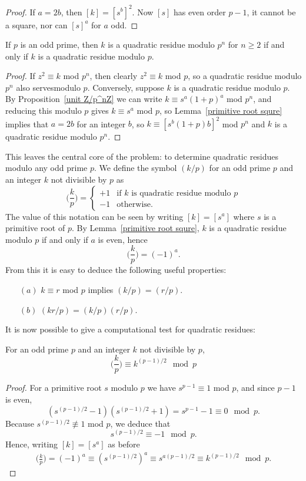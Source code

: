 \begin{proof}
If $a=2b$, then $[k]=[s^b]^2$. Now $[s]$ has even order $p-1$, it cannot be a square, nor can $[s]^a$ for $a$ odd.
\end{proof}
\begin{proposition}
If $p$ is an odd prime, then $k$ is a quadratic residue modulo $p^n$ for $n\geq 2$ if and only if $k$ is a quadratic residue modulo $p$.
\end{proposition}
\begin{proof}
If $z^2\equiv k$ mod $p^n$, then clearly $z^2\equiv k$ mod $p$, so a quadratic residue modulo $p^n$ also servesmodulo $p$. Conversely, suppose $k$ is a quadratic residue modulo $p$. By Proposition~\ref{unit Z/p^nZ} we can write $k\equiv s^a(1+p)^a$ mod $p^n$, and reducing this modulo $p$ gives $k\equiv s^a$ mod $p$, so Lemma~\ref{primitive root squre} implies that $a=2b$ for an integer $b$, so $k\equiv[s^b(1+p)b]^2$ mod $p^n$ and $k$ is a quadratic residue modulo $p^n$.
\end{proof}
This leaves the central core of the problem: to determine quadratic residues modulo any odd prime $p$. We define the symbol $(k/p)$ for an odd prime
$p$ and an integer $k$ not divisible by $p$ as
\[\Big(\frac{k}{p}\Big)=\begin{cases}
+1&\text{if $k$ is quadratic residue modulo $p$}\\
-1&\text{otherwise}.
\end{cases}\]
The value of this notation can be seen by writing $[k]=[s^a]$ where $s$ is a primitive root of $p$. By Lemma~\ref{primitive root squre}, $k$ is a quadratic residue modulo $p$ if and only if $a$ is even, hence
\[\Big(\frac{k}{p}\Big)=(-1)^a.\]
From this it is easy to deduce the following useful properties:
\begin{proposition}
\mbox{}
\begin{itemize}
\item[$(a)$] $k\equiv r$ mod $p$ implies $(k/p)=(r/p)$.
\item[$(b)$] $(kr/p)=(k/p)(r/p)$.
\end{itemize}
\end{proposition}
It is now possible to give a computational test for quadratic residues:
\begin{proposition}
For an odd prime $p$ and an integer $k$ not divisible by $p$,
\[\Big(\frac{k}{p}\Big)\equiv k^{(p-1)/2}\mod p\]
\end{proposition}
\begin{proof}
For a primitive root $s$ modulo $p$ we have $s^{p-1}\equiv 1$ mod $p$, and since $p-1$ is even, 
\[(s^{(p-1)/2}-1)(s^{(p-1)/2}+1)=s^{p-1}-1\equiv0\mod p.\]
Because $s^{(p-1)/2}\not\equiv1$ mod $p$, we deduce that
\[s^{(p-1)/2}\equiv -1\mod p.\]
Hence, writing $[k]=[s^a]$ as before
\begin{align*}
\Big(\frac{k}{p}\Big)=(-1)^a\equiv(s^{(p-1)/2})^a\equiv s^{a(p-1)/2}\equiv k^{(p-1)/2}\mod p.
\end{align*}
\end{proof}

